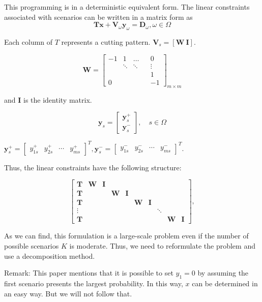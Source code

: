 This programming is in a deterministic equivalent form. 
The linear constraints associated with scenarios can be written in a matrix form as
\[\mathbf{T} \mathbf{x} + \mathbf{V}_\omega \mathbf{y}_\omega = \mathbf{D}_\omega, \omega\in \Omega\]

Each column of $T$ represents a cutting pattern.
$\mathbf{V}_s = [\mathbf{W} ~ \mathbf{I}]$.  

$$
\mathbf{W}=\left[\begin{array}{ccccc}
-1 & 1 & \ldots & & 0 \\
& \ddots & \ddots & & \vdots \\
& & & & 1 \\
0 & & & & -1
\end{array}\right]_{m \times m}
$$

and $\mathbf{I}$ is the identity matrix.

$$
\mathbf{y}_{s}=\left[\begin{array}{l}
\mathbf{y}_{s}^{+} \\
\mathbf{y}_{s}^{-}
\end{array}\right], \quad s \in \Omega
$$

$\mathbf{y}_{s}^{+}=\left[\begin{array}{lllll}y_{1 s}^{+} & y_{2 s}^{+} & \cdots & y_{m s}^{+}\end{array}\right]^{T}, \mathbf{y}_{s}^{-}=\left[\begin{array}{llll}y_{1 s}^{-} & y_{2 s}^{-} & \cdots & y_{m s}^{-}\end{array}\right]^{T}$.

Thus, the linear constraints have the following structure:

$$
\left[\begin{array}{cccccccccc}
\mathbf{T} & \mathbf{W} & \mathbf{I} & & & & & & & \\
\mathbf{T} & & & \mathbf{W} & \mathbf{I} & & & & & \\
\mathbf{T} & & & & & \mathbf{W} & \mathbf{I} & & & \\
\vdots & & & & & & & \ddots & & \\
\mathbf{T} & & & & & & & & \mathbf{W} & \mathbf{I}
\end{array}\right],
$$

As we can find, this formulation is a large-scale problem even if the number of possible scenarios $K$ is moderate. Thus, we need to reformulate the problem and use a decomposition method.

Remark: This paper \cite{alem2010cutting} mentions that it is possible to set $y_1 =0$ by assuming the first scenario presents the largest probability. In this way, $x$ can be determined in an easy way. But we will not follow that.

